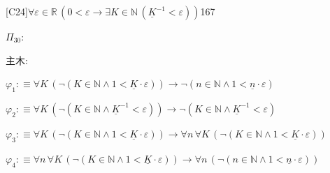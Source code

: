 \begin{fullproof}{[C24]}{$\forall \varepsilon \in \mathbb{R}\,(0 < \varepsilon \to \exists K \in \mathbb{N}\,(\underline{K}^{-1} < \varepsilon))$}{167}
\begin{ptree}
\end{ptree}
\noindent$\Pi_{30}$:
\begin{ptree}
\noLine
{}
\noLine
{}
\end{ptree}
\noindent 主木:
\begin{ptree}
\noLine
{}
\end{ptree}
\begin{abbrevlist}
\item $\varphi_{1} :\equiv \forall K\,(\neg (K \in \mathbb{N} \land 1 < \underline{K} \cdot \varepsilon)) \to \neg (n \in \mathbb{N} \land 1 < \underline{n} \cdot \varepsilon)$
\item $\varphi_{2} :\equiv \forall K\,(\neg (K \in \mathbb{N} \land \underline{K}^{-1} < \varepsilon)) \to \neg (K \in \mathbb{N} \land \underline{K}^{-1} < \varepsilon)$
\item $\varphi_{3} :\equiv \forall K\,(\neg (K \in \mathbb{N} \land 1 < \underline{K} \cdot \varepsilon)) \to \forall n\,\forall K\,(\neg (K \in \mathbb{N} \land 1 < \underline{K} \cdot \varepsilon))$
\item $\varphi_{4} :\equiv \forall n\,\forall K\,(\neg (K \in \mathbb{N} \land 1 < \underline{K} \cdot \varepsilon)) \to \forall n\,(\neg (n \in \mathbb{N} \land 1 < \underline{n} \cdot \varepsilon))$

\end{abbrevlist}
\end{fullproof}
